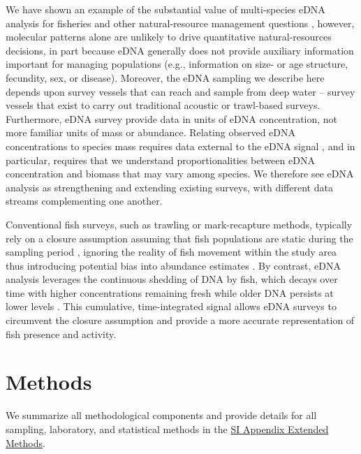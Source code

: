 \documentclass{article}
\begin{document}
We have shown an example of the substantial value of multi-species eDNA analysis for fisheries and other natural-resource management questions \cite{ledger2024,stoeckle2024}, however, molecular patterns alone are unlikely to drive quantitative natural-resources decisions, in part because eDNA generally does not provide auxiliary information important for managing populations (e.g., information on size- or age structure, fecundity, sex, or disease). Moreover, the eDNA sampling we describe here depends upon survey vessels that can reach and sample from deep water – survey vessels that exist to carry out traditional acoustic or trawl-based surveys. Furthermore, eDNA survey provide data in units of eDNA concentration, not more familiar units of mass or abundance. Relating observed eDNA concentrations to species mass requires data external to the eDNA signal \cite{guri2024a}, and in particular, requires that we understand proportionalities between eDNA concentration and biomass that may vary among species. We therefore see eDNA analysis as strengthening and extending existing surveys, with different data streams complementing one another. 

Conventional fish surveys, such as trawling or mark-recapture methods, typically rely on a closure assumption assuming that fish populations are static during the sampling period \cite{bailey2014}, ignoring the reality of fish movement within the study area thus introducing potential bias into abundance estimates \cite{rota2009}. By contrast, eDNA analysis leverages the continuous shedding of DNA by fish, which decays over time with higher concentrations remaining fresh while older DNA persists at lower levels \cite{thomsen2015,jerde2011}. This cumulative, time-integrated signal allows eDNA surveys to circumvent the closure assumption and provide a more accurate representation of fish presence and activity.

\section*{Methods}
We summarize all methodological components and provide details for all sampling, laboratory, and statistical methods in the \href{SI_Appendix.pdf}{SI Appendix Extended Methods}.
\end{document}
